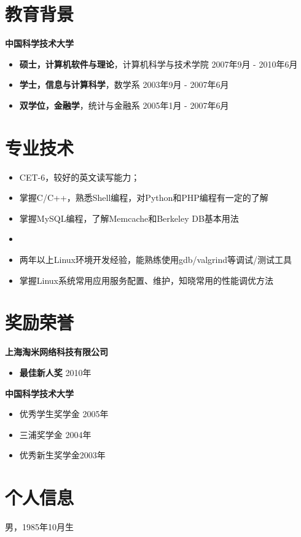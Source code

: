 \documentclass[margin]{res}
\newcommand{\ustc}{中国科学技术大学}
\newcommand{\taomee}{上海淘米网络科技有限公司}
\begin{document}
\section{教育背景}
{\bf \large \ustc}\\[1mm]
\begin{itemize}
    \item {\bf 硕士，计算机软件与理论}，计算机科学与技术学院 \hfill 2007年9月 - 2010年6月
    \item {\bf 学士，信息与计算科学}，数学系 \hfill 2003年9月 - 2007年6月
    \item {\bf 双学位，金融学}，统计与金融系 \hfill 2005年1月 - 2007年6月
\end{itemize}


\section{专业技术}
\begin{itemize}
    \item CET-6，较好的英文读写能力；
    \item 掌握C/C++，熟悉Shell编程，对Python和PHP编程有一定的了解
    \item 掌握MySQL编程，了解Memcache和Berkeley DB基本用法
    \item 

    \item 两年以上Linux环境开发经验，能熟练使用gdb/valgrind等调试/测试工具
    \item 掌握Linux系统常用应用服务配置、维护，知晓常用的性能调优方法
\end{itemize}


\section{奖励荣誉} 
{\bf \taomee}\\
\begin{itemize}
    \item {\bf 最佳新人奖} \hfill 2010年
\end{itemize}
{\bf \ustc}\\
\begin{itemize}
    \item 优秀学生奖学金 \hfill 2005年
    \item 三浦奖学金 \hfill 2004年
    \item 优秀新生奖学金\hfill 2003年
\end{itemize}

\section{个人信息}
    男，1985年10月生
\end{document}
